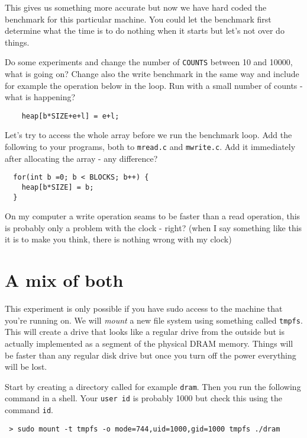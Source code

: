 \documentclass[a4paper,11pt]{article}
\begin{document}
This gives us something more accurate but now we have hard coded the
benchmark for this particular machine. You could let the benchmark
first determine what the time is to do nothing when it starts but let's
not over do things.

Do some experiments and change the number of {\tt COUNTS} between 10
and 10000, what is going on? Change also the write benchmark in the
same way and include for example the operation below in the loop. Run
with a small number of counts - what is happening?

\begin{lstlisting}
	heap[b*SIZE+e+l] = e+l;
\end{lstlisting}

Let's try to access the whole array before we run the benchmark
loop. Add the following to your programs, both to {\tt mread.c} and
{\tt mwrite.c}. Add it immediately after allocating the array - any
difference?

\begin{lstlisting}
  for(int b =0; b < BLOCKS; b++) {
    heap[b*SIZE] = b;
  }  
\end{lstlisting}

On my computer a write operation seams to be faster than a read
operation, this is probably only a problem with the clock - right?
(when I say something like this it is to make you think, there is
nothing wrong with my clock)

\section{A mix of both}

This experiment is only possible if you have sudo access to the
machine that you're running on. We will {\em mount} a new file system
using something called {\tt tmpfs}. This will create a drive that looks
like a regular drive from the outside but is actually implemented
as a segment of the physical DRAM memory. Things will be faster than
any regular disk drive but once you turn off the power everything will
be lost.

Start by creating a directory called for example {\tt dram}. Then you
run the following command in a shell. Your {\tt user id} is probably
1000 but check this using the command {\tt id}.

\begin{verbatim}
 > sudo mount -t tmpfs -o mode=744,uid=1000,gid=1000 tmpfs ./dram
\end{verbatim}
\end{document}
